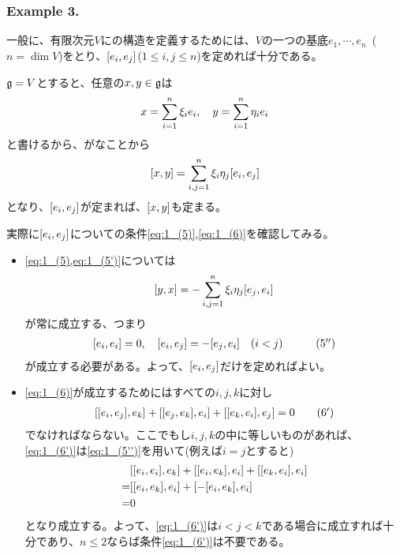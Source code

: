 \documentclass[../main]{subfiles}
\begin{document}
\subsubsection*{Example 3.}\label{ex:3}
\begin{theorem}
  一般に、有限次元$V$に{}の構造を定義するためには、$V$の一つの基底$e_{1},\cdots,e_{n}$~($n=\dim{V}$)をとり、$\comm{e_{i}}{e_{j}}$($1\le i,j\le n$)を定めれば十分である。
\end{theorem}
\begin{Proof}
  \href{Def:1_3}{$\mathfrak{g}=V$}とすると、任意の$x,y\in\mathfrak{g}$は
  \begin{align*}
    x=\sum_{i=1}^{n}\xi_{i}e_{i}\qc y=\sum_{i=1}^{n}\eta_{i}e_{i}
  \end{align*}
  と書けるから、がなことから
  \begin{align*}
    \comm{x}{y}=\sum_{i,j=1}^{n}\xi_{i}\eta_{j}\comm{e_{i}}{e_{j}}
  \end{align*}
  となり、$\comm{e_{i}}{e_{j}}$が定まれば、$\comm{x}{y}$も定まる。
\end{Proof}
\begin{remark}
  実際に$\comm{e_{i}}{e_{j}}$について{}の条件\eqref{eq:1_(5)},\eqref{eq:1_(6)}を確認してみる。
  \begin{itemize}
    \item \cref{eq:1_(5),eq:1_(5')}については
      \begin{align*}
        \comm{y}{x}=-\sum_{i,j=1}^{n}\xi_{i}\eta_{j}\comm{e_{j}}{e_{i}}
      \end{align*}
      が常に成立する、つまり
      \begin{align*}
        \comm{e_{i}}{e_{i}}=0\qc \comm{e_{i}}{e_{j}}=-\comm{e_{j}}{e_{i}} \qq{$(i<j)$} \tag{5$^{\dprime}$}\label{eq:1_(5'')}
      \end{align*}
      が成立する必要がある。よって、$\comm{e_{i}}{e_{j}}$だけを定めればよい。
    \item \cref{eq:1_(6)}が成立するためにはすべての$i,j,k$に対し
      \begin{align*}
        \comm{\comm{e_{i}}{e_{j}}}{e_{k}}
        +\comm{\comm{e_{j}}{e_{k}}}{e_{i}}
        +\comm{\comm{e_{k}}{e_{i}}}{e_{j}}
        =0 \tag{6$^\prime$}\label{eq:1_(6')}
      \end{align*}
      でなければならない。ここでもし$i,j,k$の中に等しいものがあれば、\eqref{eq:1_(6')}は\eqref{eq:1_(5'')}を用いて(例えば$i=j$とすると)
      \begin{align*}
        &\comm{\comm{e_{i}}{e_{i}}}{e_{k}}
        +\comm{\comm{e_{i}}{e_{k}}}{e_{i}}
        +\comm{\comm{e_{k}}{e_{i}}}{e_{i}}\\
        =&\comm{\comm{e_{i}}{e_{k}}}{e_{i}}
        +\comm{-\comm{e_{i}}{e_{k}}}{e_{i}}\\
        =&0
      \end{align*}
      となり成立する。よって、\eqref{eq:1_(6')}は$i<j<k$である場合に成立すれば十分であり、$n\le2$ならば条件\eqref{eq:1_(6')}は不要である。
  \end{itemize}
\end{remark}
\end{document}
